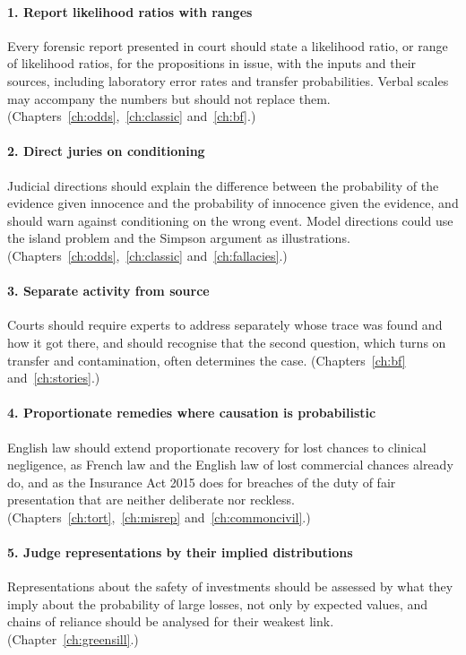 \paragraph{1. Report likelihood ratios with ranges} Every forensic report presented in court should state a likelihood ratio, or range of likelihood ratios, for the propositions in issue, with the inputs and their sources, including laboratory error rates and transfer probabilities. Verbal scales may accompany the numbers but should not replace them. (Chapters~\ref{ch:odds},~\ref{ch:classic} and~\ref{ch:bf}.)

\paragraph{2. Direct juries on conditioning} Judicial directions should explain the difference between the probability of the evidence given innocence and the probability of innocence given the evidence, and should warn against conditioning on the wrong event. Model directions could use the island problem and the Simpson argument as illustrations. (Chapters~\ref{ch:odds},~\ref{ch:classic} and~\ref{ch:fallacies}.)

\paragraph{3. Separate activity from source} Courts should require experts to address separately whose trace was found and how it got there, and should recognise that the second question, which turns on transfer and contamination, often determines the case. (Chapters~\ref{ch:bf} and~\ref{ch:stories}.)

\paragraph{4. Proportionate remedies where causation is probabilistic} English law should extend proportionate recovery for lost chances to clinical negligence, as French law and the English law of lost commercial chances already do, and as the Insurance Act 2015 does for breaches of the duty of fair presentation that are neither deliberate nor reckless. (Chapters~\ref{ch:tort},~\ref{ch:misrep} and~\ref{ch:commoncivil}.)

\paragraph{5. Judge representations by their implied distributions} Representations about the safety of investments should be assessed by what they imply about the probability of large losses, not only by expected values, and chains of reliance should be analysed for their weakest link. (Chapter~\ref{ch:greensill}.)

